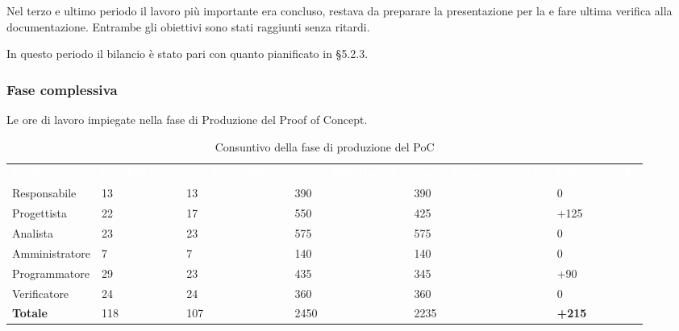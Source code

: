 Nel terzo e ultimo periodo il lavoro più importante era concluso, restava da preparare la presentazione per la \RTB{} e fare ultima verifica alla documentazione. Entrambe gli obiettivi sono stati raggiunti senza ritardi.

In questo periodo il bilancio è stato pari con quanto pianificato in §5.2.3.

\pagebreak 

\subsubsection{Fase complessiva}
Le ore di lavoro impiegate nella fase di Produzione del Proof of Concept.

\begin{table}[H]
\begin{center}
\renewcommand{\arraystretch}{1.5}
\begin{tabular}{ m{}<{\centering}  m{}<{\centering} m{}<{\centering} m{}<{\centering} m{}<{\centering} m{}<{\centering}}
	\rowcolor{darkblue}
	\textcolor{white}{\textbf{Ruolo}} & \textcolor{white}{\textbf{Ore Effettive}} & \textcolor{white}{\textbf{Ore Preventivate}}&\textcolor{white}{\textbf{Costo Effettivo (\euro)}}&\textcolor{white}{\textbf{Costo Preventivato (\euro)}}&\textcolor{white}{\textbf{Differenza (\euro)}}\\ 
	Responsabile  & 13 & 13 & 390 & 390 & 0\\	
	
	Progettista & 22 & 17 & 550 & 425 & +125\\
	
	Analista & 23 & 23 & 575 & 575 & 0\\
	
	Amministratore & 7 & 7 & 140 & 140 & 0\\
	
	Programmatore & 29 & 23 & 435 & 345 &  +90\\
	
	Verificatore & 24 & 24 & 360 & 360 & 0\\
	
	\textbf{Totale} & 118 & 107 & 2450 & 2235 & \textbf{+215} \\
	
\end{tabular}
\caption{Consuntivo della fase di produzione del PoC}
\end{center}
\end{table}

